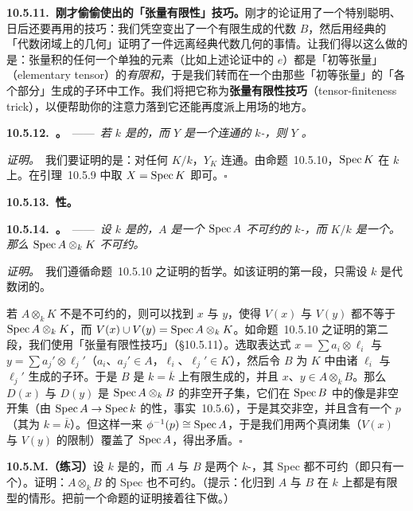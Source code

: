 \textbf{10.5.11.\ 刚才偷偷使出的「张量有限性」技巧。}\quad 刚才的论证用了一个特别聪明、日后还要再用的技巧：我们凭空变出了一个有限生成的代数 $B$，然后用经典的「代数闭域上的几何」证明了一件远离经典代数几何的事情。让我们得以这么做的是：张量积的任何一个单独的元素（比如上述论证中的 $e$）都是「初等张量」（elementary tensor）的\emph{有限和}，于是我们转而在一个由那些「初等张量」的「各个部分」生成的子环中工作。我们将把它称为\textbf{张量有限性技巧}（tensor-finiteness trick），以便帮助你的注意力落到它还能再度派上用场的地方。

\textbf{10.5.12.\ \trhCorollary{}。}\ ——\ \emph{若 $k$ 是\trSeparablyClosed{}的，而 $Y$ 是一个连通的 $k$-\trScheme，则 $Y$ \trGeometricallyConnected{}。}

\emph{证明。}\ 我们要证明的是：对任何\trFieldExtension{} $K/k$，$Y_K$ 连通。由命题~10.5.10，$\operatorname{Spec} K$ 在 $k$ 上\trGeometricallyConnected{}。在引理~10.5.9 中取 $X=\operatorname{Spec} K$ 即可。\hfill$\square$

\textbf{10.5.13.\ \trIrreducible{}性。}

\textbf{10.5.14.\ \trhProposition{}。}\ ——\ \emph{设 $k$ 是\trSeparablyClosed{}的，$A$ 是一个 $\operatorname{Spec} A$ 不可约的 $k$-\trAlgebra，而 $K/k$ 是一个\trFieldExtension。那么 $\operatorname{Spec} A\otimes_k K$ 不可约。}

\emph{证明。}\ 我们遵循命题~10.5.10 之证明的哲学。如该证明的第一段，只需设 $k$ 是代数闭的。

若 $A\otimes_k K$ 不是不可约的，则可以找到 $x$ 与 $y$，使得 $V(x)$ 与 $V(y)$ 都不等于 $\operatorname{Spec} A\otimes_k K$，而 $V(x)\cup V(y)=\operatorname{Spec} A\otimes_k K$。如命题~10.5.10 之证明的第二段，我们使用「张量有限性技巧」（\S10.5.11）。选取表达式 $x=\sum a_i\otimes\ell_i$ 与 $y=\sum a_j'\otimes\ell_j'$（$a_i$、$a_j'\in A$，$\ell_i$、$\ell_j'\in K$），然后令 $B$ 为 $K$ 中由诸 $\ell_i$ 与 $\ell_j'$ 生成的子环。于是 $B$ 是 $k=\overline{k}$ 上有限生成的\trIntegralDomain，并且 $x$、$y\in A\otimes_k B$。那么 $D(x)$ 与 $D(y)$ 是 $\operatorname{Spec} A\otimes_k B$ 的非空开子集，它们在 $\operatorname{Spec} B$ 中的像是非空开集（由 $\operatorname{Spec} A\to\operatorname{Spec} k$ 的\trUniversallyOpen{}性，事实~10.5.6），于是其交非空，并且含有一个\trClosedPoint{} $p$（其\trResidueField{}为 $k=\overline{k}$）。但这样一来 $\phi^{-1}(p)\cong\operatorname{Spec} A$，于是我们用两个真闭集（$V(x)$ 与 $V(y)$ 的限制）覆盖了 $\operatorname{Spec} A$，得出矛盾。\hfill$\square$

\textbf{10.5.M.（练习）}\quad 设 $k$ 是\trSeparablyClosed{}的，而 $A$ 与 $B$ 是两个 $k$-\trAlgebra，其 Spec 都不可约（即只有一个\trMinimalPrime）。证明：$A\otimes_k B$ 的 Spec 也不可约。（提示：化归到 $A$ 与 $B$ 在 $k$ 上都是有限型的情形。把前一个命题的证明接着往下做。）

